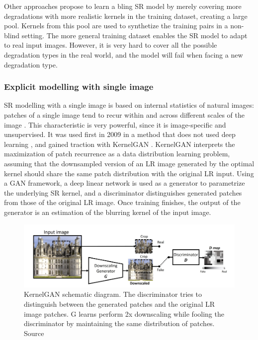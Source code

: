         Other approaches propose to learn a bling SR model by merely covering more degradations with more realistic kernels in the training dataset, creating a large pool.
        Kernels from this pool are used to synthetize the training pairs in a non-blind setting. 
        The more general training dataset enables the SR model to adapt to real input images. 
        However, it is very hard to cover all the possible degradation types in the real world, and the model will fail when facing a new degradation type.


        \subsubsection{Explicit modelling with single image}

        SR modelling with a single image is based on internal statistics of natural images: patches of a single image tend to recur within and across different scales of the image \cite{zontak2011}.
        This characteristic is very powerful, since it is image-specific and unsupervised. It was used first in 2009 in a method that does not used deep learning \cite{glasner2009}, and gained traction with KernelGAN \cite{bellkligler2020blind}. 
        KernelGAN interprets the maximization of patch recurrence as a data distribution learning problem, assuming that the downsampled version of an LR image generated by the optimal kernel should share the same patch distribution with the original LR input.
        Using a GAN framework, a deep linear network is used as a generator to parametrize the underlying SR kernel, and a discriminator distinguishes generated patches from those of the original LR image.
        Once training finishes, the output of the generator is an estimation of the blurring kernel of the input image. 

        \begin{figure}[H]
            \centering
            \includegraphics[width=\textwidth]{Includes/2-kernelGAN.png}
            \caption{KernelGAN schematic diagram. The discriminator tries to distinguish between the generated patches and the original LR image patches. G learns perform 2x downscaling while fooling the discriminator by maintaining the same distribution of patches. Source \cite{bellkligler2020blind}}    
            \label{fig:2-kernelGAN}
        \end{figure}


